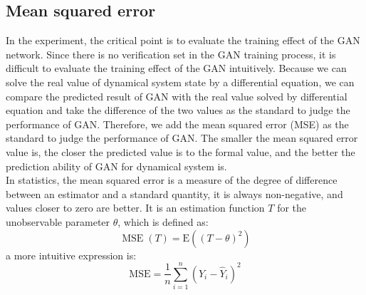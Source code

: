\documentclass[11pt,a4paper]{article}
\begin{document}
\subsection{Mean squared error}
In the experiment, the critical point is to evaluate the training effect of the GAN network. Since there is no verification set in the GAN training process, it is difficult to evaluate the training effect of the GAN intuitively. Because we can solve the real value of dynamical system state by a differential equation, we can compare the predicted result of GAN with the real value solved by differential equation and take the difference of the two values as the standard to judge the performance of GAN. Therefore, we add the mean squared error (MSE) as the standard to judge the performance of GAN. The smaller the mean squared error value is, the closer the predicted value is to the formal value, and the better the prediction ability of GAN for dynamical system is.
\\
\newline
In statistics, the mean squared error is a measure of the degree of difference between an estimator and a standard quantity, it is always non-negative, and values closer to zero are better. It is an estimation function $T$ for the unobservable parameter $\theta$, which is defined as:
$$
\operatorname{MSE}(T)=\mathrm{E}\left((T-\theta)^{2}\right)
$$
a more intuitive expression is:
$$
\mathrm{MSE}=\frac{1}{n} \sum_{i=1}^{n}\left(Y_{i}-\hat{Y}_{i}\right)^{2}
$$
\end{document}
